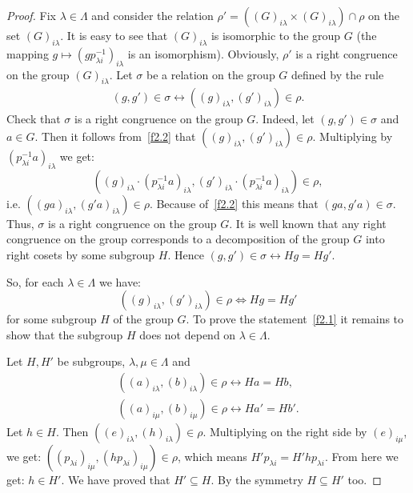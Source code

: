 \documentclass{birkau}
\numberwithin{equation}{section}
\theoremstyle{plain}
\theoremstyle{definition}
\begin{document}
	\begin{proof}
	    Fix $\lambda \in \Lambda$ and consider the relation $\rho' = ((G)_{i \lambda} \times (G)_{i \lambda}) \cap \rho$ on the set $(G)_{i \lambda}$. It is easy to see that $(G)_{i \lambda}$ is isomorphic to the group $G$ (the mapping $g \mapsto (g p_{\lambda i}^{-1})_{i \lambda}$ is an isomorphism). Obviously, $\rho'$ is a right congruence on the group $(G)_{i \lambda}$. Let $\sigma$ be a relation on the group $G$ defined by the rule
		\begin{gather}
			(g,g') \in \sigma \leftrightarrow ((g)_{i \lambda},(g')_{i \lambda}) \in \rho. \label{f2.2}
		\end{gather}
		Check that $\sigma$ is a right congruence on the group $G$. Indeed, let $(g,g') \in \sigma$ and $a \in G$. Then it follows from~\eqref{f2.2} that $((g)_{i \lambda},(g')_{i \lambda}) \in \rho$. Multiplying by $(p_{\lambda i}^{-1} a)_{i \lambda}$ we get: $$ ((g)_{i \lambda} \cdot (p_{\lambda i}^{-1} a)_{i \lambda},(g')_{i \lambda} \cdot (p_{\lambda i}^{-1} a)_{i \lambda}) \in \rho, $$ i.e. $ ((g a)_{i \lambda},(g' a)_{i \lambda}) \in \rho $. Because of~\eqref{f2.2} this means that $(ga,g'a) \in \sigma$. Thus, $\sigma$ is a right congruence on the group $G$. It is well known that any right congruence on the group corresponds to a decomposition of the group $G$ into right cosets by some subgroup $H$. Hence $(g,g') \in \sigma \leftrightarrow Hg = Hg'$.
		
		So, for each $\lambda \in \Lambda$ we have: $$ ((g)_{i \lambda},(g')_{i \lambda}) \in \rho \Leftrightarrow Hg = Hg' $$ for some subgroup $H$ of the group $G$. To prove the statement~\eqref{f2.1} it remains to show that the subgroup $H$ does not depend on $\lambda \in \Lambda$.
		
		\par Let $H,H'$ be subgroups, $\lambda,\mu \in \Lambda$ and
		\begin{gather*}
			((a)_{i \lambda},(b)_{i \lambda}) \in \rho \leftrightarrow Ha = Hb, \\
			((a)_{i \mu},(b)_{i \mu}) \in \rho \leftrightarrow Ha' = Hb'.
		\end{gather*}
		Let $h \in H$. Then $((e)_{i \lambda},(h)_{i \lambda}) \in \rho$. Multiplying on the right side by $(e)_{i \mu}$, we get: $((p_{\lambda i})_{i \mu}, (h p_{\lambda i})_{i \mu}) \in \rho$, which means $H' p_{\lambda i} = H' h p_{\lambda i}$. From here we get: $h \in H'$. We have proved that $H' \subseteq H$. By the symmetry $H \subseteq H'$ too.
	\end{proof}
	
\end{document}
